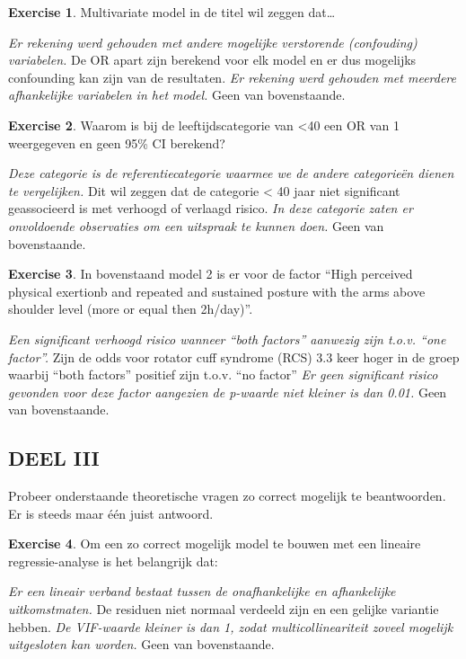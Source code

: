 \documentclass[
]{book}
\theoremstyle{definition}
\theoremstyle{definition}
\theoremstyle{definition}
\newtheorem{exercise}{Exercise}[chapter]
\theoremstyle{definition}
\theoremstyle{remark}
\begin{document}
\begin{exercise}
Multivariate model in de titel wil zeggen dat\ldots{}

\emph{Er rekening werd gehouden met andere mogelijke verstorende (confouding) variabelen. }De OR apart zijn berekend voor elk model en er dus mogelijks confounding kan zijn van de resultaten. \emph{Er rekening werd gehouden met meerdere afhankelijke variabelen in het model. }Geen van bovenstaande.
\end{exercise}

\begin{exercise}
Waarom is bij de leeftijdscategorie van \textless40 een OR van 1 weergegeven en geen 95\% CI berekend?

\emph{Deze categorie is de referentiecategorie waarmee we de andere categorieën dienen te vergelijken. }Dit wil zeggen dat de categorie \textless{} 40 jaar niet significant geassocieerd is met verhoogd of verlaagd risico. \emph{In deze categorie zaten er onvoldoende observaties om een uitspraak te kunnen doen. }Geen van bovenstaande.
\end{exercise}

\begin{exercise}
In bovenstaand model 2 is er voor de factor ``High perceived physical exertionb and repeated and sustained posture with the arms above shoulder level (more or equal then 2h/day)''.

\emph{Een significant verhoogd risico wanneer ``both factors'' aanwezig zijn t.o.v. ``one factor''. }Zijn de odds voor rotator cuff syndrome (RCS) 3.3 keer hoger in de groep waarbij ``both factors'' positief zijn t.o.v. ``no factor'' \emph{Er geen significant risico gevonden voor deze factor aangezien de p-waarde niet kleiner is dan 0.01. }Geen van bovenstaande.
\end{exercise}

\hypertarget{deel-iii}{%
\subsection*{DEEL III}\label{deel-iii}}


Probeer onderstaande theoretische vragen zo correct mogelijk te beantwoorden. Er is steeds maar één juist antwoord.

\begin{exercise}
Om een zo correct mogelijk model te bouwen met een lineaire regressie-analyse is het belangrijk dat:

\emph{Er een lineair verband bestaat tussen de onafhankelijke en afhankelijke uitkomstmaten. }De residuen niet normaal verdeeld zijn en een gelijke variantie hebben. \emph{De VIF-waarde kleiner is dan 1, zodat multicollineariteit zoveel mogelijk uitgesloten kan worden. }Geen van bovenstaande.
\end{exercise}
\end{document}

